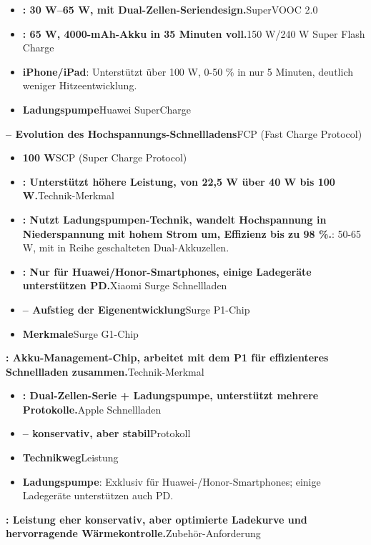 \begin{itemize}
  \item \textbf{: 30 W–65 W, mit Dual-Zellen-Seriendesign.}SuperVOOC 2.0
  \item \textbf{: 65 W, 4000-mAh-Akku in 35 Minuten voll.}150 W/240 W Super Flash Charge
  \item \textbf{iPhone/iPad}: Unterstützt über 100 W, 0-50 \% in nur 5 Minuten, deutlich weniger Hitzeentwicklung.
  \item \textbf{Ladungspumpe}Huawei SuperCharge
\end{itemize}

\textbf{– Evolution des Hochspannungs-Schnellladens}FCP (Fast Charge Protocol)

\begin{itemize}
  \item \textbf{100 W}SCP (Super Charge Protocol)
  \item \textbf{: Unterstützt höhere Leistung, von 22,5 W über 40 W bis 100 W.}Technik-Merkmal
  \item \textbf{: Nutzt Ladungspumpen-Technik, wandelt Hochspannung in Niederspannung mit hohem Strom um, Effizienz bis zu 98 \%.}: 50-65 W, mit in Reihe geschalteten Dual-Akkuzellen.
  \item \textbf{: Nur für Huawei/Honor-Smartphones, einige Ladegeräte unterstützen PD.}Xiaomi Surge Schnellladen
  \item \textbf{– Aufstieg der Eigenentwicklung}Surge P1-Chip
  \item \textbf{Merkmale}Surge G1-Chip
\end{itemize}

\textbf{: Akku-Management-Chip, arbeitet mit dem P1 für effizienteres Schnellladen zusammen.}Technik-Merkmal

\begin{itemize}
  \item \textbf{: Dual-Zellen-Serie + Ladungspumpe, unterstützt mehrere Protokolle.}Apple Schnellladen
  \item \textbf{– konservativ, aber stabil}Protokoll
  \item \textbf{Technikweg}Leistung
  \item \textbf{Ladungspumpe}: Exklusiv für Huawei-/Honor-Smartphones; einige Ladegeräte unterstützen auch PD.
\end{itemize}

\textbf{: Leistung eher konservativ, aber optimierte Ladekurve und hervorragende Wärmekontrolle.}Zubehör-Anforderung

